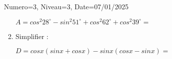 \documentclass[a4paper,12pt]{article}
\begin{document}
\begin{Maquette}[DS]{Numero=3, Niveau=3, Date=07/01/2025}
\begin{exercice}[BaremeDetaille]
\begin{enumerate}
$A=cos^{2}28^{\circ}-sin^{2}51^{\circ}+cos^{2}62^{\circ}+cos^{2}39^{\circ}= $\anserline[6]

\item{} Simplifier :

$D=cosx(sinx+cosx)-sinx(cosx-sinx)  =$ \anserline[7]
\end{enumerate}
\end{exercice}
\end{Maquette}
\end{document}

